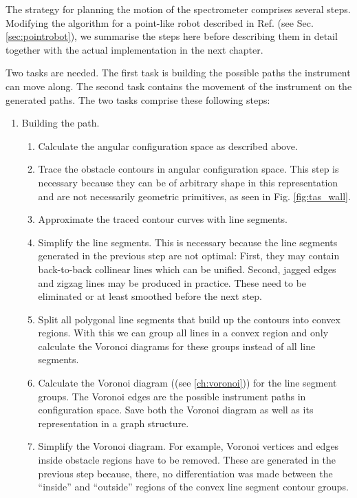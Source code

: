The strategy for planning the motion of the spectrometer comprises several steps. Modifying the algorithm for
a point-like robot described in Ref. \cite[Ch. 13, pp. 283-306]{Berg2008} (see Sec. \ref{sec:pointrobot}), we summarise the
steps here before describing them in detail together with the actual implementation in the next chapter.

Two tasks are needed. The first task is building the possible paths the instrument can move along. The second task contains the movement of the instrument on the generated paths. The two tasks comprise these following steps:
\begin{enumerate}
	\item Building the path.
	\begin{enumerate}
		\item Calculate the angular configuration space as described above.
		\item Trace the obstacle contours in angular configuration space. This step is necessary because they can be of arbitrary
			shape in this representation and are not necessarily geometric primitives, as seen in Fig. \ref{fig:tas_wall}.
		\item Approximate the traced contour curves with line segments.
		\item Simplify the line segments. This is necessary because the line segments generated in the previous step are not optimal:
			First, they may contain back-to-back collinear lines which can be unified. Second, jagged edges and zigzag lines may be
			produced in practice. These need to be eliminated or at least smoothed before the next step.
		\item Split all polygonal line segments that build up the contours into convex regions. With this we can group all lines
			in a convex region and only calculate the Voronoi diagrams for these groups instead of all line segments.
		\item Calculate the Voronoi diagram ((see \ref{ch:voronoi})) for the line segment groups. The Voronoi edges are the
		possible instrument paths in configuration space. Save both the Voronoi diagram as well as its representation in a graph structure.
		\item Simplify the Voronoi diagram. For example, Voronoi vertices and edges inside obstacle regions have to be removed.
			These are generated in the previous step because, there, no differentiation was made between the ``inside'' and
			``outside'' regions of the convex line segment contour groups.
	\end{enumerate}


\end{enumerate}
